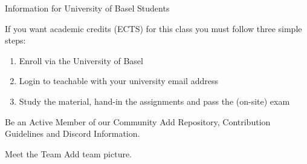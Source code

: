 \documentclass[]{beamer}
\begin{document}
\begin{frame}{Information for University of Basel Students}

If you want academic credits (ECTS) for this class you must follow three simple steps:
\vspace{0.5em}

	\begin{enumerate}
		\item<2-> Enroll via the University of Basel
		\item<3-> Login to teachable with your university email address
		\item<4-> Study the material, hand-in the assignments and pass the (on-site) exam
	\end{enumerate}
\vspace{1em}
	
\end{frame}

\begin{frame}{Be an Active Member of our Community}
	Add Repository, Contribution Guidelines and Discord Information.

\end{frame}

\begin{frame}{Meet the Team}
	Add team picture.
\end{frame}
\end{document}
